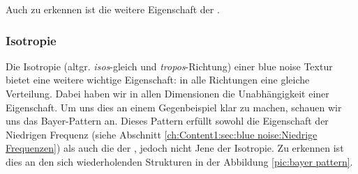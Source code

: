 Auch zu erkennen ist die weitere Eigenschaft der .

\subsubsection{Isotropie}
\label{ch:Content1:sec:blue noise:Isotropie}

Die Isotropie (altgr. \textit{isos}-gleich und \textit{tropos}-Richtung)
einer blue noise Textur bietet eine weitere wichtige Eigenschaft: in alle Richtungen eine gleiche  
Verteilung. Dabei haben wir in allen Dimensionen
die Unabhängigkeit einer Eigenschaft. Um uns dies an einem Gegenbeispiel 
klar zu machen, schauen wir uns das Bayer-Pattern an. Dieses Pattern erfüllt sowohl 
die Eigenschaft der Niedrigen Frequenz (siehe Abschnitt \ref{ch:Content1:sec:blue noise:Niedrige Frequenzen}) als auch 
die der , jedoch nicht Jene der Isotropie.
Zu erkennen ist dies an den sich wiederholenden Strukturen in der Abbildung \ref{pic:bayer pattern}.

